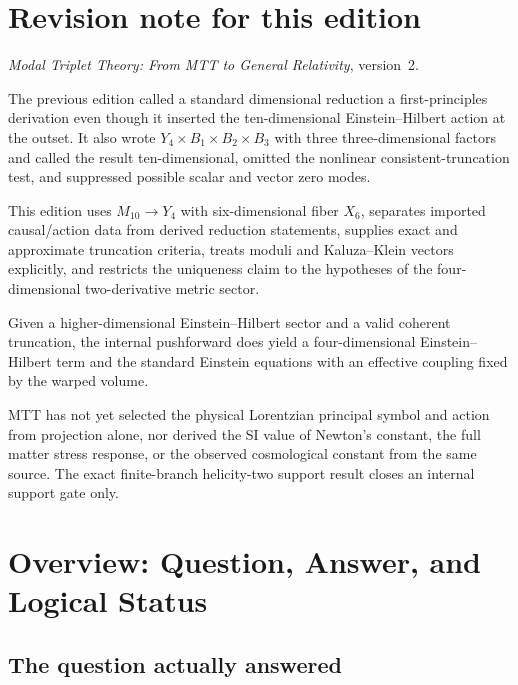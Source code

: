 \documentclass[11pt,a4paper]{article}
\theoremstyle{definition}
\theoremstyle{remark}
\begin{document}
\section*{Revision note for this edition}
\begin{description}[leftmargin=3.5cm,style=nextline]
\item[Supersedes.] \emph{Modal Triplet Theory: From MTT to General
Relativity}, version~2.
\item[Reason.] The previous edition called a standard dimensional reduction a
first-principles derivation even though it inserted the ten-dimensional
Einstein--Hilbert action at the outset.  It also wrote
\(Y_4\times B_1\times B_2\times B_3\) with three three-dimensional factors
and called the result ten-dimensional, omitted the nonlinear
consistent-truncation test, and suppressed possible scalar and vector zero
modes.
\item[Resolution.] This edition uses \(M_{10}\to Y_4\) with
six-dimensional fiber \(X_6\), separates imported causal/action data from
derived reduction statements, supplies exact and approximate truncation
criteria, treats moduli and Kaluza--Klein vectors explicitly, and restricts
the uniqueness claim to the hypotheses of the four-dimensional
two-derivative metric sector.
\item[Retained result.] Given a higher-dimensional Einstein--Hilbert sector
and a valid coherent truncation, the internal pushforward does yield a
four-dimensional Einstein--Hilbert term and the standard Einstein equations
with an effective coupling fixed by the warped volume.
\item[Remaining boundary.] MTT has not yet selected the physical Lorentzian
principal symbol and action from projection alone, nor derived the SI value
of Newton's constant, the full matter stress response, or the observed
cosmological constant from the same source.  The exact finite-branch
helicity-two support result closes an internal support gate only.
\end{description}

\tableofcontents

\section{Overview: Question, Answer, and Logical Status}

\subsection{The question actually answered}
\end{document}
